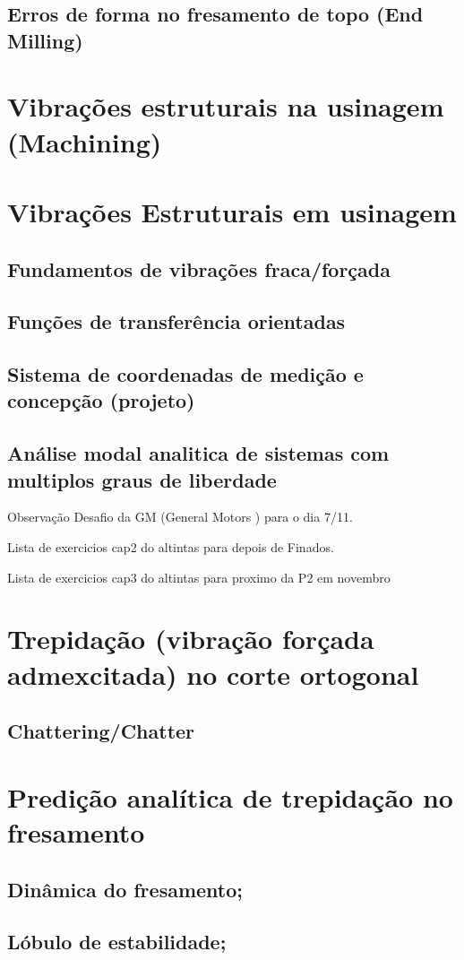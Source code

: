 \subsection{Erros de forma no fresamento de topo (End Milling)}

\section{Vibrações estruturais na usinagem (Machining)}

\section{Vibrações Estruturais em usinagem}

\subsection{Fundamentos de vibrações fraca/forçada}

\subsection{Funções de transferência orientadas}

\subsection{Sistema de coordenadas de medição e concepção (projeto)}

\subsection{Análise modal analitica de sistemas com multiplos graus de liberdade}

Observação Desafio da GM (General Motors ) para o dia 7/11.

Lista de exercicios cap2 do altintas para depois de Finados.

Lista de exercicios cap3 do altintas para proximo da P2 em novembro

\section{Trepidação (vibração forçada admexcitada) no corte ortogonal}

\subsection{Chattering/Chatter}

\section{Predição analítica de trepidação no fresamento}

\subsection{Dinâmica do fresamento;}

\subsection{Lóbulo de estabilidade;}